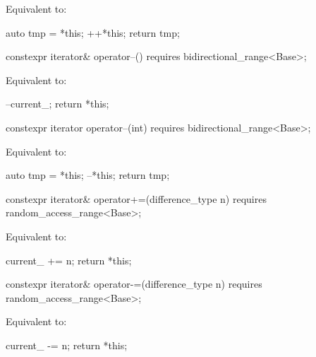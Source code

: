 \begin{itemdescr}
\pnum
\effects
Equivalent to:
\begin{codeblock}
auto tmp = *this;
++*this;
return tmp;
\end{codeblock}
\end{itemdescr}

%
\begin{itemdecl}
constexpr iterator& operator--() requires bidirectional_range<Base>;
\end{itemdecl}

\begin{itemdescr}
\pnum
\effects
Equivalent to:
\begin{codeblock}
--current_;
return *this;
\end{codeblock}
\end{itemdescr}

%
\begin{itemdecl}
constexpr iterator operator--(int) requires bidirectional_range<Base>;
\end{itemdecl}

\begin{itemdescr}
\pnum
\effects
Equivalent to:
\begin{codeblock}
auto tmp = *this;
--*this;
return tmp;
\end{codeblock}
\end{itemdescr}

%
\begin{itemdecl}
constexpr iterator& operator+=(difference_type n)
  requires random_access_range<Base>;
\end{itemdecl}

\begin{itemdescr}
\pnum
\effects
Equivalent to:
\begin{codeblock}
current_ += n;
return *this;
\end{codeblock}
\end{itemdescr}

%
\begin{itemdecl}
constexpr iterator& operator-=(difference_type n)
  requires random_access_range<Base>;
\end{itemdecl}

\begin{itemdescr}
\pnum
\effects
Equivalent to:
\begin{codeblock}
current_ -= n;
return *this;
\end{codeblock}
\end{itemdescr}

